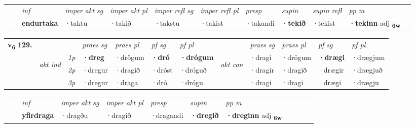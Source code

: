 \begin{tabular}{llllllllllll}
 & & \textit{inf} & \textit{imper akt sg} & \textit{imper akt pl} & \textit{imper refl sg} & \textit{imper refl pl} & \textit{presp} & \textit{supin} & \textit{supin refl} & \textit{pp m}     \\*
  & & \textbf{endurtaka} & ·taktu  & ·takið & ·takstu & ·takist & ·takandi &  \textbf{·tekið} & ·tekist & \textbf{·tekinn} adj \textbf{\textsubscript{6w}} \\*
\cmidrule{1-12}
\end{tabular}



\begin{tabular}{llllllllllll} \toprule
\multirow{4}{*}{{{\textbf{v{\textsubscript{6}}} \Large{\textbf{129.}}}}}  & &   &  \textit{praes sg}  & \textit{praes pl}  &\textit{ pf sg} & \textit{pf pl} &  &  \textit{praes sg}  & \textit{praes pl}  & \textit{pf sg} & \textit{pf pl } \\*
	\cmidrule{4-7} \cmidrule{9-12}
 & \multirow{3}{*}{\begin{turn}{90}\textit{akt ind}\end{turn}} & {\textit{1p}} & \textbf{·dreg} & ·drögum    & \textbf{·dró} & \textbf{·drógum} & \multirow{3}{*}{\begin{turn}{90}\textit{akt con}\end{turn}} &·dragi & ·drögum & \textbf{·drægi} & ·drægjum\\*
& &  {\textit{2p}} &  ·dregur  & ·dragið   & ·dróst & ·dróguð & & ·dragir & ·dragið & ·drægir & ·drægjuð \\*
& &  {\textit{3p}} & ·dregur & ·draga   & ·dró & ·drógu & & ·dragi & ·dragi& ·drægi & ·drægju  \\*
\cmidrule{4-7} \cmidrule{9-12}
\end{tabular}


\begin{tabular}{llllllllllll}
 & & \textit{inf} & \textit{imper akt sg} & \textit{imper akt pl}   & \textit{presp} & \textit{supin}  & \textit{pp m}     \\*
  & & \textbf{yfirdraga} & ·dragðu  & ·dragið   & ·dragandi &  \textbf{·dregið}  & \textbf{·dreginn} adj \textbf{\textsubscript{6w}} \\*
\cmidrule{1-12}
\end{tabular}



